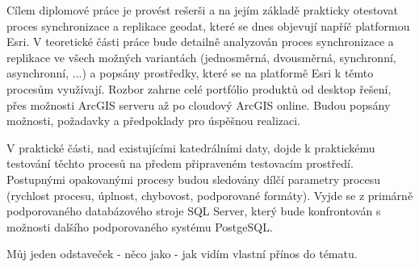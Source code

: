 
      Cílem diplomové práce je provést rešerši a na jejím základě
      prakticky otestovat proces synchronizace a replikace geodat, které
      se dnes objevují napříč platformou Esri. V teoretické části práce
      bude detailně analyzován proces synchronizace a replikace ve všech
      možných variantách (jednosměrná, dvousměrná, synchronní,
      asynchronní, ...) a popsány prostředky, které se na platformě Esri k
      těmto procesům využívají. Rozbor zahrne celé portfólio produktů od
      desktop řešení, přes možnosti ArcGIS serveru až po cloudový ArcGIS
      online. Budou popsány možnosti, požadavky a předpoklady pro úspěšnou
      realizaci.

      V praktické části, nad existujícími katedrálními daty, dojde k
      praktickému testování těchto procesů na předem připraveném
      testovacím prostředí. Postupnými opakovanými procesy budou sledovány
      dílčí parametry procesu (rychlost procesu, úplnost, chybovost,
      podporované formáty). Vyjde se z primárně podporovaného databázového
      stroje SQL Server, který bude konfrontován s možnosti dalšího
      podporovaného systému PostgeSQL.

      Můj jeden odstaveček - něco jako - jak vidím vlastní přínos do tématu. 

